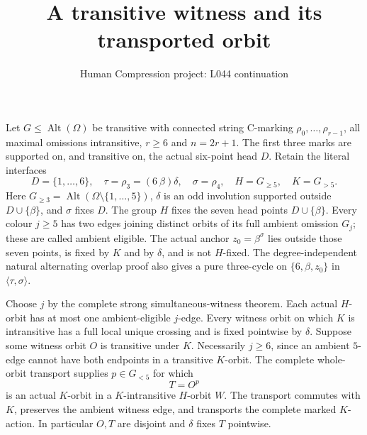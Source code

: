 \documentclass[11pt,a4paper]{article}
\title{A transitive witness and its transported orbit}
\author{Human Compression project: L044 continuation}
\date{}
\newcommand{\gen}[1]{\langle#1\rangle}
\begin{document}
\maketitle
Let $G\le\operatorname{Alt}(\Omega)$ be transitive with
connected string C-marking $\rho_0,\ldots,\rho_{r-1}$,
all maximal omissions intransitive, $r\ge6$ and $n=2r+1$.
The first three marks are supported on, and transitive on,
the actual six-point head $D$. Retain the literal interfaces
\[
 D=\{1,\ldots,6\},\quad \tau=\rho_3=(6\ \beta)\delta,
 \quad \sigma=\rho_4,\quad H=G_{\ge5},\quad K=G_{>5}.
\]
Here $G_{\ge3}=\operatorname{Alt}(\Omega\setminus\{1,\ldots,5\})$,
$\delta$ is an odd involution supported outside $D\cup\{\beta\}$,
and $\sigma$ fixes $D$. The group $H$ fixes the seven head points
$D\cup\{\beta\}$. Every colour $j\ge5$ has two edges joining
distinct orbits of its full ambient omission $G_j$; these
are called ambient eligible. The actual anchor
$z_0=\beta^\sigma$ lies outside those seven points,
is fixed by $K$ and by $\delta$, and is not $H$-fixed.
The degree-independent natural alternating overlap proof
also gives a pure three-cycle on $\{6,\beta,z_0\}$
in $\gen{\tau,\sigma}$.

Choose $j$ by the complete strong simultaneous-witness
theorem. Each actual $H$-orbit has at most one
ambient-eligible $j$-edge. Every witness orbit on which
$K$ is intransitive has a full local unique crossing
and is fixed pointwise by $\delta$.
Suppose some witness orbit $O$ is transitive under $K$.
Necessarily $j\ge6$, since an ambient $5$-edge cannot
have both endpoints in a transitive $K$-orbit.
The complete whole-orbit transport supplies
$p\in G_{<5}$ for which
\[
                         T=O^p
\]
is an actual $K$-orbit in a $K$-intransitive $H$-orbit
$W$. The transport commutes with $K$, preserves the
ambient witness edge, and transports the complete marked
$K$-action. In particular $O,T$ are disjoint and
$\delta$ fixes $T$ pointwise.
\end{document}
